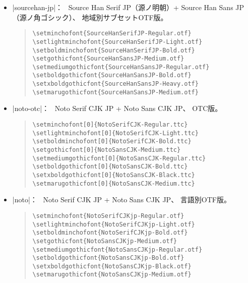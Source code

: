 \documentclass[uplatex,dvipdfmx,a4paper]{jsarticle}
\newcommand{\Means}{：\ }
\begin{document}
\begin{itemize}
\begin{quote}\small\begin{verbatim}
\setminchofont{SourceHanSerif-Regular.otf}
\setlightminchofont{SourceHanSerif-Light.otf}
\setboldminchofont{SourceHanSerif-Bold.otf}
\setgothicfont{SourceHanSans-Medium.otf}
\setmediumgothicfont{SourceHanSans-Regular.otf}
\setboldgothicfont{SourceHanSans-Bold.otf}
\setxboldgothicfont{SourceHanSans-Heavy.otf}
\setmarugothicfont{SourceHanSans-Medium.otf}
\end{verbatim}\end{quote}

\item |sourcehan-jp|\Means
  Source Han Serif JP（源ノ明朝）+ Source Han Sans JP（源ノ角ゴシック）、
  地域別サブセットOTF版。

\begin{quote}\small\begin{verbatim}
\setminchofont{SourceHanSerifJP-Regular.otf}
\setlightminchofont{SourceHanSerifJP-Light.otf}
\setboldminchofont{SourceHanSerifJP-Bold.otf}
\setgothicfont{SourceHanSansJP-Medium.otf}
\setmediumgothicfont{SourceHanSansJP-Regular.otf}
\setboldgothicfont{SourceHanSansJP-Bold.otf}
\setxboldgothicfont{SourceHanSansJP-Heavy.otf}
\setmarugothicfont{SourceHanSansJP-Medium.otf}
\end{verbatim}\end{quote}

\item |noto-otc|\Means
  Noto Serif CJK JP + Noto Sans CJK JP、
  OTC版。

\begin{quote}\small\begin{verbatim}
\setminchofont[0]{NotoSerifCJK-Regular.ttc}
\setlightminchofont[0]{NotoSerifCJK-Light.ttc}
\setboldminchofont[0]{NotoSerifCJK-Bold.ttc}
\setgothicfont[0]{NotoSansCJK-Medium.ttc}
\setmediumgothicfont[0]{NotoSansCJK-Regular.ttc}
\setboldgothicfont[0]{NotoSansCJK-Bold.ttc}
\setxboldgothicfont[0]{NotoSansCJK-Black.ttc}
\setmarugothicfont[0]{NotoSansCJK-Medium.ttc}
\end{verbatim}\end{quote}

\item |noto|\Means
  Noto Serif CJK JP + Noto Sans CJK JP、
  言語別OTF版。

\begin{quote}\small\begin{verbatim}
\setminchofont{NotoSerifCJKjp-Regular.otf}
\setlightminchofont{NotoSerifCJKjp-Light.otf}
\setboldminchofont{NotoSerifCJKjp-Bold.otf}
\setgothicfont{NotoSansCJKjp-Medium.otf}
\setmediumgothicfont{NotoSansCJKjp-Regular.otf}
\setboldgothicfont{NotoSansCJKjp-Bold.otf}
\setxboldgothicfont{NotoSansCJKjp-Black.otf}
\setmarugothicfont{NotoSansCJKjp-Medium.otf}
\end{verbatim}\end{quote}


\end{itemize}
\end{document}
